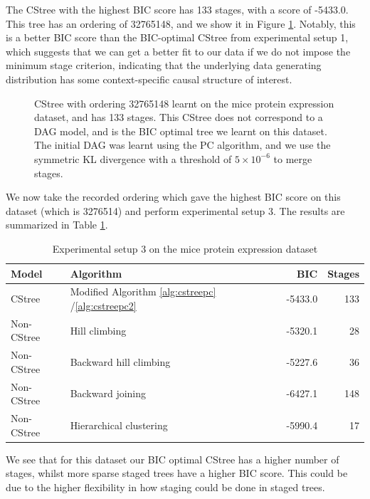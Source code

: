 \documentclass{tufte-book}
\begin{document}
The CStree with the highest BIC score has 133 stages, with a score of -5433.0. This tree has an ordering of 32765148, and we show it in Figure \ref{fig:micemaxbic}. Notably, this is a better BIC score than the BIC-optimal CStree from experimental setup 1, which suggests that we can get a better fit to our data if we do not impose the minimum stage criterion, indicating that the underlying data generating distribution has some context-specific causal structure of interest.


\begin{figure}[!h]\label{fig:micemaxbic}
   \begin{floatrow}
%
\caption{CStree with ordering 32765148 learnt on the mice protein expression dataset, and has 133 stages. This CStree does not correspond to a DAG model, and is the BIC optimal tree we learnt on this dataset. The initial DAG was learnt using the PC algorithm, and we use the symmetric KL divergence with a threshold of $5\times 10^{-6}$ to merge stages.}
        
   \end{floatrow}
\end{figure}

We now take the recorded ordering which gave the highest BIC score on this dataset (which is 3276514) and perform experimental setup 3. The results are summarized in Table \ref{tab:org3716310}.

\begin{table}[htbp]
\caption{\label{tab:org3716310}Experimental setup 3 on the mice protein expression dataset}
\centering
\begin{tabular}{l|l|r|r}
\hline
Model & Algorithm & BIC & Stages\\
\hline
CStree & Modified Algorithm \ref{alg:cstreepc} /\ref{alg:cstreepc2} & -5433.0 & 133\\
Non-CStree & Hill climbing & -5320.1 & 28\\
Non-CStree & Backward hill climbing & -5227.6 & 36\\
Non-CStree & Backward joining & -6427.1 & 148\\
Non-CStree & Hierarchical clustering & -5990.4 & 17\\
\end{tabular}
\end{table}

We see that for this dataset our BIC optimal CStree has a higher number of stages, whilst more sparse staged trees have a higher BIC score. This could be due to the higher flexibility in how staging could be done in staged trees.
\end{document}
